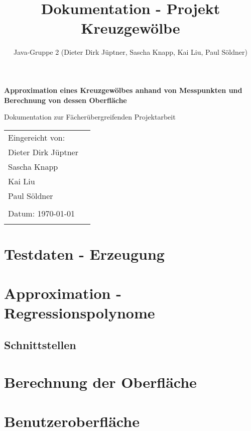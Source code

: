 \documentclass[11pt, bibliography=totocnumbered]{scrartcl}
\title{Dokumentation - Projekt Kreuzgew\"olbe}
\author{Java-Gruppe 2 (Dieter Dirk J\"uptner, Sascha Knapp, Kai Liu, Paul S\"oldner)}
\begin{document}
	\begin{titlepage}
		\begin{center}
			\vspace*{2cm}
			
			\huge
			\textbf{Approximation eines Kreuzgew\"olbes anhand von Messpunkten und Berechnung von dessen Oberfl\"ache}
			
			\vspace{1.5cm}
			\LARGE
			Dokumentation zur F\"acher\"ubergreifenden Projektarbeit
		\end{center}    
		\vspace{1cm}
		
		\vfill{}
		\large
		\begin{tabular}{@{}l l}
			Eingereicht von: & \\
			Dieter Dirk J\"uptner \\
			Sascha Knapp \\
			Kai Liu \\
			Paul S\"oldner \\
			\\
			Datum: \today \\
			\\
		\end{tabular}
		\vfill
	\end{titlepage}
\newpage
\tableofcontents
\newpage
\section{Testdaten - Erzeugung}

\section{Approximation - Regressionspolynome}
\subsection{Schnittstellen}

\section{Berechnung der Oberfl\"ache}

\section{Benutzeroberfl\"ache}
\end{document}
